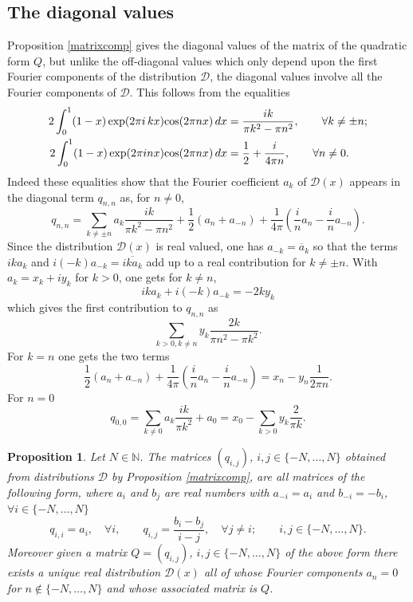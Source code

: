 \documentclass{amsart}
\newtheorem{prop}[thm]{Proposition}
\def\N{{\mathbb N}}
\def\cD{{\mathcal D}}
\def\cos{{{\rm cos}}}
\def\N{{\mathbb N}}
\def\cD{{\mathcal D}}
\def\cos{{{\rm cos}}}
\begin{document}
\subsection{The diagonal values}
Proposition \ref{matrixcomp} gives the diagonal values of the matrix of the quadratic form $Q$, but unlike the off-diagonal values which only depend upon the first Fourier  components of the distribution $\cD$, the diagonal values involve all the Fourier components of $\cD$. This follows from the equalities 
\begin{align*}
2 \int_0^1 (1-x) \exp (2 \pi  i \,k x) \cos (2 \pi  n x) \, dx &=\frac{i k}{\pi  k^2-\pi  n^2}, \qquad  \forall k\neq \pm n;\\
2 \int_0^1 (1-x) \exp (2 \pi  i n x) \cos (2 \pi  n x) \, dx&=\frac{1}{2}+\frac{i}{4 \pi  n},\qquad \forall n\neq 0.
\end{align*}
Indeed these equalities show that the Fourier coefficient $a_k$ of $\cD(x)$ appears in the diagonal term $q_{n,n}$ as, for $n\neq 0$, 
$$
q_{n,n}=\sum_{k\neq \pm n} a_k\frac{i k}{\pi  k^2-\pi  n^2}+\frac 12(a_n+a_{-n})+\frac{1}{4\pi}(\frac i n a_n-\frac i n a_{-n}).
$$
Since the distribution $\cD(x)$ is real valued, one has $a_{-k}=\overline a_k$ so that the terms $ik a_k$ and $i(-k)a_{-k}=\overline{ik a_k}$ add up to a real contribution for $k\neq \pm n$. With $a_k=x_k+i y_k$ for  $k>0$, one gets for $k\neq n$, 
$$
ika_k+i(-k)a_{-k}=-2ky_k
$$
which gives the first contribution to $q_{n,n}$ as 
$$
\sum_{k>0,k\neq n}y_k\frac{2 k}{\pi  n^2-\pi  k^2}.
$$
 For $k=n$ one gets the two terms
 $$
 \frac 12(a_n+a_{-n})+\frac{1}{4\pi}(\frac i n a_n-\frac i n a_{-n})=x_n-y_n\frac{1}{2\pi n}.
 $$
  For $n=0$ 
$$
q_{0,0}=\sum_{k\neq 0}a_k\frac{i k}{\pi  k^2}+a_0=x_0-\sum_{k> 0}y_k\frac{2}{\pi  k}.
$$ 
\begin{prop}\label{freedom} Let $N\in \N$. The matrices $(q_{i,j})$, $i,j\in \{-N,\ldots,N\}$ obtained from distributions $\cD$ by Proposition \ref{matrixcomp}, are all matrices of the following form, where $a_i$ and $b_j$ are real numbers with $a_{-i}=a_i$ and $b_{-i}=-b_i$, $\forall i\in \{-N,\ldots,N\}$
	\begin{equation}\label{form}
	q_{i,i}=a_i,\quad  \forall i, \qquad  q_{i,j}=\frac{b_i-b_j}{i-j}, \quad \forall j\neq i;
  \qquad i,j\in \{-N,\ldots,N\}.	\end{equation}
  Moreover given a matrix $Q=(q_{i,j})$, $i,j\in \{-N,\ldots,N\}$ of the above form there exists a unique real distribution $\cD(x)$ all of whose Fourier components $a_n=0$ for $n \notin \{-N,\ldots,N\}$ and whose associated matrix is $Q$.
\end{prop}
\end{document}
